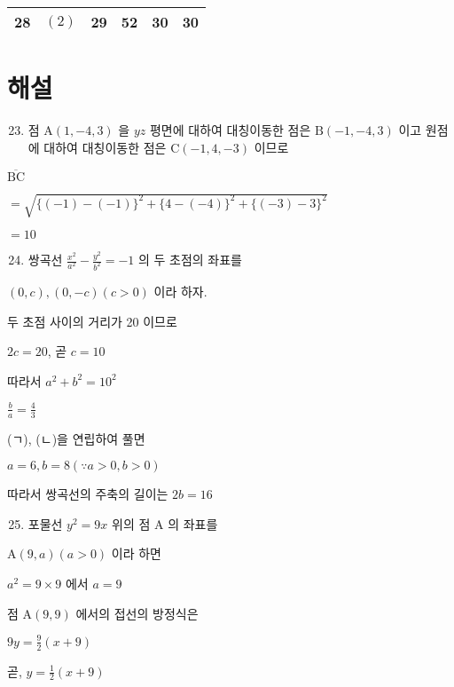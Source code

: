 \documentclass[10pt]{article}
\begin{document}
\begin{center}
\begin{tabular}{l|l|l|l|l|l|}
\hline
28 & \((2)\) & 29 & 52 & 30 & 30 \\
\hline
\end{tabular}
\end{center}

\section*{해설}
\begin{enumerate}
  \setcounter{enumi}{22}
  \item 점 \(\mathrm{A}(1,-4,3)\) 을 \(y z\) 평면에 대하여 대칭이동한 점은 \(\mathrm{B}(-1,-4,3)\) 이고 원점에 대하여 대칭이동한 점은 \(\mathrm{C}(-1,4,-3)\) 이므로
\end{enumerate}

\(\overline{\mathrm{BC}}\)

\(=\sqrt{\{(-1)-(-1)\}^{2}+\{4-(-4)\}^{2}+\{(-3)-3\}^{2}}\)

\(=10\)

\begin{enumerate}
  \setcounter{enumi}{23}
  \item 쌍곡선 \(\frac{x^{2}}{a^{2}}-\frac{y^{2}}{b^{2}}=-1\) 의 두 초점의 좌표를
\end{enumerate}

\((0, c),(0,-c)(c>0)\) 이라 하자.

두 초점 사이의 거리가 20 이므로

\(2 c=20\), 곧 \(c=10\)

따라서 \(a^{2}+b^{2}=10^{2}\)

\(\frac{b}{a}=\frac{4}{3}\)

(ㄱ), (ㄴ)을 연립하여 풀면

\(a=6, b=8(\because a>0, b>0)\)

따라서 쌍곡선의 주축의 길이는 \(2 b=16\)

\begin{enumerate}
  \setcounter{enumi}{24}
  \item 포물선 \(y^{2}=9 x\) 위의 점 A 의 좌표를
\end{enumerate}

\(\mathrm{A}(9, a)(a>0)\) 이라 하면

\(a^{2}=9 \times 9\) 에서 \(a=9\)

점 \(\mathrm{A}(9,9)\) 에서의 접선의 방정식은

\(9 y=\frac{9}{2}(x+9)\)

곧, \(y=\frac{1}{2}(x+9)\)
\end{document}
